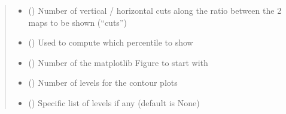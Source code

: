 \documentclass[letterpaper,10pt,english]{sphinxmanual}
\begin{document}
\begin{fulllineitems}
\begin{fulllineitems}
\begin{quote}
\begin{description}
\begin{itemize}
\item {} 
\sphinxAtStartPar
{} (\sphinxstyleliteralemphasis{\sphinxupquote{ {[}}}\sphinxstyleliteralemphasis{\sphinxupquote{{]}}}) \textendash{} Number of vertical / horizontal cuts along the ratio
between the 2 maps to be shown (“cuts”)

\item {} 
\sphinxAtStartPar
{} (\sphinxstyleliteralemphasis{\sphinxupquote{ {[}}}\sphinxstyleliteralemphasis{\sphinxupquote{{]}}}) \textendash{} Used to compute which percentile to show

\item {} 
\sphinxAtStartPar
{} (\sphinxstyleliteralemphasis{\sphinxupquote{ {[}}}\sphinxstyleliteralemphasis{\sphinxupquote{{]}}}) \textendash{} Number of the matplotlib Figure to start with

\item {} 
\sphinxAtStartPar
{} (\sphinxstyleliteralemphasis{\sphinxupquote{ {[}}}\sphinxstyleliteralemphasis{\sphinxupquote{{]}}}) \textendash{} Number of levels for the contour plots

\item {} 
\sphinxAtStartPar
{} (\sphinxstyleliteralemphasis{\sphinxupquote{ {[}}}\sphinxstyleliteralemphasis{\sphinxupquote{{]}}}) \textendash{} Specific list of levels if any (default is None)


\end{itemize}
\end{description}
\end{quote}
\end{fulllineitems}
\end{fulllineitems}
\end{document}
